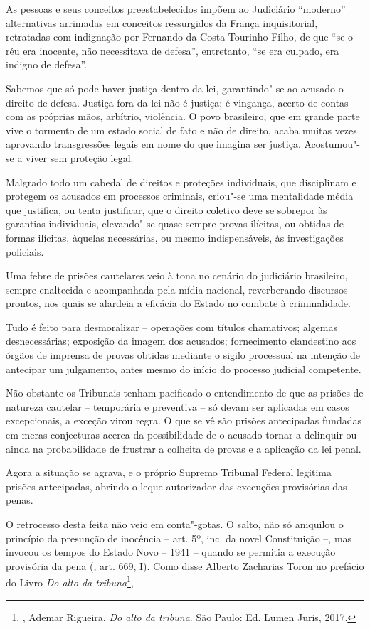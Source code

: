 As pessoas e seus conceitos preestabelecidos impõem ao Judiciário
``moderno'' alternativas arrimadas em conceitos ressurgidos da França
inquisitorial, retratadas com indignação por Fernando da Costa Tourinho
Filho, de que ``se o réu era inocente, não necessitava de defesa'',
entretanto, ``se era culpado, era indigno de defesa''.

Sabemos que só pode haver justiça dentro da lei, garantindo"-se ao
acusado o direito de defesa. Justiça fora da lei não é justiça; é
vingança, acerto de contas com as próprias mãos, arbítrio, violência. O
povo brasileiro, que em grande parte vive o tormento de um estado social
de fato e não de direito, acaba muitas vezes aprovando transgressões
legais em nome do que imagina ser justiça. Acostumou"-se a viver sem
proteção legal.

Malgrado todo um cabedal de direitos e proteções individuais, que
disciplinam e protegem os acusados em processos criminais, criou"-se uma
mentalidade média que justifica, ou tenta justificar, que o direito
coletivo deve se sobrepor às garantias individuais, elevando"-se quase
sempre provas ilícitas, ou obtidas de formas ilícitas, àquelas
necessárias, ou mesmo indispensáveis, às investigações policiais.

Uma febre de prisões cautelares veio à tona no cenário do judiciário
brasileiro, sempre enaltecida e acompanhada pela mídia nacional,
reverberando discursos prontos, nos quais se alardeia a eficácia do
Estado no combate à criminalidade.

Tudo é feito para desmoralizar -- operações com títulos chamativos;
algemas desnecessárias; exposição da imagem dos acusados; fornecimento
clandestino aos órgãos de imprensa de provas obtidas mediante o sigilo
processual na intenção de antecipar um julgamento, antes mesmo do início
do processo judicial competente.

Não obstante os Tribunais tenham pacificado o entendimento de que as
prisões de natureza cautelar -- temporária e preventiva -- só devam ser
aplicadas em casos excepcionais, a exceção virou regra. O que se vê são
prisões antecipadas fundadas em meras conjecturas acerca da
possibilidade de o acusado tornar a delinquir ou ainda na probabilidade
de frustrar a colheita de provas e a aplicação da lei penal.

Agora a situação se agrava, e o próprio Supremo Tribunal Federal
legitima prisões antecipadas, abrindo o leque autorizador das execuções
provisórias das penas.

O retrocesso desta feita não veio em conta"-gotas. O salto, não só
aniquilou o princípio da presunção de inocência -- art. 5º,
inc.  da novel Constituição --, mas invocou os tempos do Estado Novo
-- 1941 -- quando se permitia a execução provisória da pena (, art.
669, I). Como disse Alberto Zacharias Toron no prefácio do Livro \emph{Do
alto da tribuna}\footnote{, Ademar Rigueira. \emph{Do alto da tribuna}.
São Paulo: Ed. Lumen Juris, 2017.},

